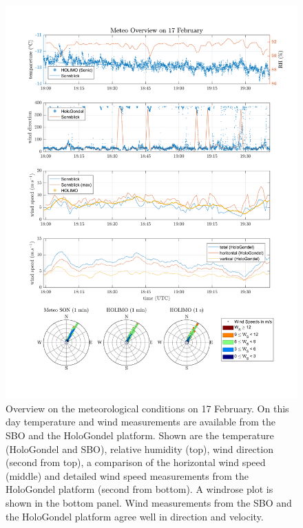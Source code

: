 \documentclass[draft,linenumbers]{agujournal}
\begin{document}
\begin{figure}[h]
 \centering
 	\includegraphics[width=14cm]{MeteoOverview_1702.png}
 \caption{Overview on the meteorological conditions on 17 February. On this day temperature and wind measurements are available from the SBO and the HoloGondel platform. Shown are the temperature (HoloGondel and SBO), relative humidity (top), wind direction (second from top), a comparison of the horizontal wind speed (middle) and detailed wind speed measurements from the HoloGondel platform (second from bottom). A windrose plot is shown in the bottom panel. Wind measurements from the SBO and the HoloGondel platform agree well in direction and velocity.}
 \label{fig:meteo1702}
\end{figure}
\end{document}

